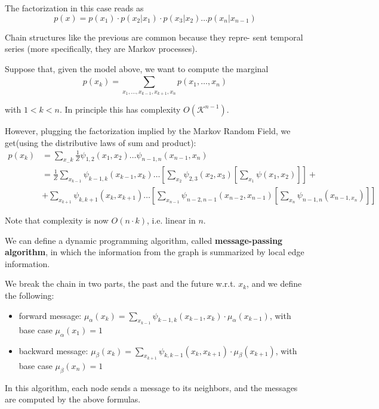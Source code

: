 The factorization in this case reads as 
$$
    p(x) = p(x_1)\cdot p(x_2|x_1)\cdot p(x_3|x_2) \dots p(x_n|x_{n-1})
$$

\begin{observationblock}
    Chain structures like the previous are common because they repre-
    sent temporal series (more specifically, they are Markov processes).
\end{observationblock}

Suppose that, given the model above, we want to compute the marginal
$$
    p(x_k) = \sum_{x_1,\dots, x_{k-1},x_{k+1},x_n}^{}p(x_1,\dots, x_n)
$$

with $1<k<n$. In principle this has complexity $O(\mathcal{K}^{n-1})$.

However, plugging the factorization implied by the Markov Random Field, we get(using the distributive laws of sum and product):
$$
\begin{array}{rl}
    p(x_k)
    & = \sum_{x_-k}^{}\frac{1}{Z}\psi_{1,2}(x_1, x_2)\dots \psi_{n-1, n}(x_{n-1}, x_n)\\
    & = \frac{1}{Z} \sum_{x_{k-1}}\psi_{k-1, k}(x_{k-1}, x_k) \dots \left[ \sum_{x_2}^{}\psi_{2,3}(x_2, x_3)\left[\sum_{x_1}^{}\psi(x_1, x_2)\right]\right] + \\
    & + \sum_{x_{k+1}}^{}\psi_{k, k+1}(x_k, x_{k+1}) \dots \left[\sum_{x_{n-1}}^{}\psi_{n-2, n-1}(x_{n-2}, x_{n-1})\left[\sum_{x_n}^{}\psi_{n-1, n}(x_{n-1, x_n})\right]\right]
\end{array}
$$

Note that complexity is now $O(n\cdot k)$, i.e. linear in $n$. 

We can define a dynamic programming algorithm, called \textbf{message-passing algorithm}, in which the information from the graph is summarized by local edge information. 

We break the chain in two parts, the past and the future w.r.t. $x_k$, and we define the following:
\begin{itemize}
    \item forward message: $\mu_\alpha(x_k) = \sum_{x_{k-1}}^{}\psi_{k-1, k}(x_{k-1}, x_k)\cdot \mu_{\alpha}(x_{k-1})$, with base case $\mu_{\alpha}(x_1) = 1$
    \item backward message: $\mu_{\beta}(x_k) = \sum_{x_{k+1}}\psi_{k, k-1}(x_k, x_{k+1})\cdot \mu_{\beta}(x_{k+1})$, with base case $\mu_{\beta}(x_n) = 1$
\end{itemize}

In this algorithm, each node sends a message to its neighbors, and the messages are computed by the above formulas.

